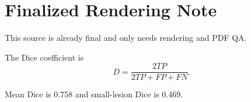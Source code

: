\documentclass{article}
\begin{document}
\section*{Finalized Rendering Note}
This source is already final and only needs rendering and PDF QA.

The Dice coefficient is
\[
D = \frac{2TP}{2TP + FP + FN}.
\]

Mean Dice is 0.758 and small-lesion Dice is 0.469.
\end{document}
